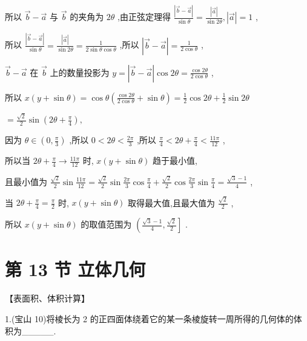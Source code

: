 \documentclass[10pt]{article}
\begin{document}
所以 \(\overrightarrow{b} - \overrightarrow{a}\) 与 \(\overrightarrow{b}\) 的夹角为 \({2\theta }\) ,由正弦定理得 \(\frac{\left| \overrightarrow{b} - \overrightarrow{a}\right| }{\sin \theta } = \frac{\left| \overrightarrow{a}\right| }{\sin {2\theta }},\left| \overrightarrow{a}\right|  = 1\) ,

所以 \(\frac{\left| \overrightarrow{b} - \overrightarrow{a}\right| }{\sin \theta } = \frac{\left| \overrightarrow{a}\right| }{\sin {2\theta }} = \frac{1}{2\sin \theta \cos \theta }\) ,所以 \(\left| {\overrightarrow{b} - \overrightarrow{a}}\right|  = \frac{1}{2\cos \theta }\) ,

\(\overrightarrow{b} - \overrightarrow{a}\) 在 \(\overrightarrow{b}\) 上的数量投影为 \(y = \left| {\overrightarrow{b} - \overrightarrow{a}}\right| \cos {2\theta } = \frac{\cos {2\theta }}{2\cos \theta }\) ,

所以 \(x\left( {y + \sin \theta }\right)  = \cos \theta \left( {\frac{\cos {2\theta }}{2\cos \theta } + \sin \theta }\right)  = \frac{1}{2}\cos {2\theta } + \frac{1}{2}\sin {2\theta }\)

\(= \frac{\sqrt{2}}{2}\sin \left( {{2\theta } + \frac{\pi }{4}}\right) ,\)

因为 \(\theta  \in  \left( {0,\frac{\pi }{3}}\right)\) ,所以 \(0 < {2\theta } < \frac{2\pi }{3}\) ,所以 \(\frac{\pi }{4} < {2\theta } + \frac{\pi }{4} < \frac{11\pi }{12}\) ,

所以当 \({2\theta } + \frac{\pi }{4} \rightarrow  \frac{11\pi }{12}\) 时, \(x\left( {y + \sin \theta }\right)\) 趋于最小值,

且最小值为 \(\frac{\sqrt{2}}{2}\sin \frac{11\pi }{12} = \frac{\sqrt{2}}{2}\sin \frac{2\pi }{3}\cos \frac{\pi }{4} + \frac{\sqrt{2}}{2}\cos \frac{2\pi }{3}\sin \frac{\pi }{4} = \frac{\sqrt{3} - 1}{4}\) ,

当 \({2\theta } + \frac{\pi }{4} = \frac{\pi }{2}\) 时, \(x\left( {y + \sin \theta }\right)\) 取得最大值,且最大值为 \(\frac{\sqrt{2}}{2}\) ,

所以 \(x\left( {y + \sin \theta }\right)\) 的取值范围为 \(\left( {\frac{\sqrt{3} - 1}{4},\frac{\sqrt{2}}{2}}\right\rbrack\) .

\section*{第 13 节 立体几何}

【表面积、体积计算】

1.(宝山 10)将棱长为 2 的正四面体绕着它的某一条棱旋转一周所得的几何体的体积为\_\_\_\_\_.
\end{document}
